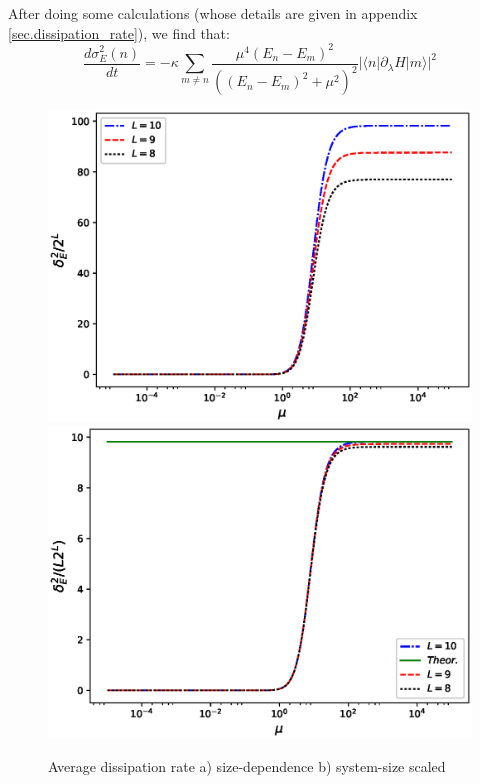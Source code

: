\documentclass[11pt,a4paper]{article}
\begin{document}
After doing some calculations (whose details are given in appendix \ref{sec.dissipation_rate}), we find that:
\begin{equation}
\boxed{
\dfrac{d \sigma^2_E (n)}{dt} =  - \kappa  \sum_{m \neq n}\dfrac{\mu^4 (E_n- E_m)^2}{((E_n-E_m)^2 + \mu^2)^2}  |\langle n |\partial_{\lambda} H |m \rangle|^2}
\end{equation}


\begin{figure}[!ht]
\begin{center}
\includegraphics[scale=0.452]{new_pics/avg_dissipation_rate_2.eps}
\includegraphics[scale=0.452]{new_pics/avg_dissipation_rate.eps}
\caption{ Average dissipation rate a) size-dependence  b) system-size scaled  }
\end{center}
\end{figure}
\end{document}
